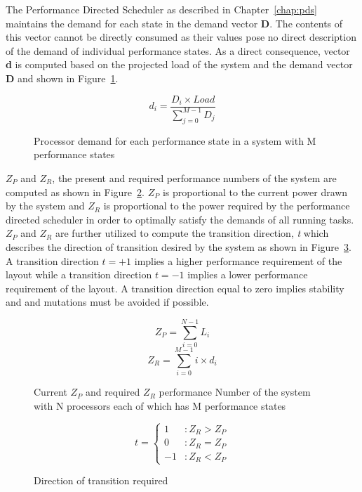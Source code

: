 The Performance Directed Scheduler as described in Chapter~\ref{chap:pds} maintains
the demand for each state in the demand vector \textbf{D}. The contents of this vector
cannot be directly consumed as their values pose no direct description of the demand 
of individual performance states. As a direct consequence, vector \textbf{d} is computed based 
on the projected load of the system and the demand vector \textbf{D} and shown in
Figure~\ref{fig:processor_demand}.

\begin{figure}[h!]
\centering
\begin{equation*}
    d_{i} = \frac{D_{i} \times Load}{\displaystyle\sum_{j=0}^{M-1} {D_{j}}}
\end{equation*}
\caption{Processor demand for each performance state in a system with M performance states}
\label{fig:processor_demand}
\end{figure}

$Z_{P}$ and $Z_{R}$, the present and required performance numbers of the system 
are computed as shown in Figure~\ref{fig:Z}. $Z_{P}$ is proportional to the current power drawn by
the system and $Z_{R}$ is proportional to the power required by the performance directed
scheduler in order to optimally satisfy the demands of all running tasks. $Z_{P}$ and $Z_{R}$ 
are further utilized to compute the transition direction, \textit{t} which describes the direction
of transition desired by the system as shown in Figure~\ref{fig:transition_dir}. A transition direction
$t = +1$ implies a higher performance requirement of the layout while a transition direction
$t = -1$ implies a lower performance requirement of the layout. A transition direction equal to zero
implies stability and and mutations must be avoided if possible.

\begin{figure}[h!]
\centering
\begin{equation*}
    Z_{P} = \displaystyle\sum_{i=0}^{N-1} {L_{i}} 
\end{equation*}
\begin{equation*}
    Z_{R} = \displaystyle\sum_{i=0}^{M-1} {i \times d_{i}} 
\end{equation*}
\caption{Current $Z_{P}$ and required $Z_{R}$ performance Number of the system with N processors each of which has M performance states}
\label{fig:Z}
\end{figure}

\begin{figure}[h!]
\centering
\begin{equation*}
    t = \left\{
     \begin{array}{lr}
       1 & : Z_{R} > Z_{P}\\
       0 & : Z_{R} = Z_{P} \\
       -1 & : Z_{R} < Z_{P}
     \end{array}
   \right.
\end{equation*}
\caption{Direction of transition required}
\label{fig:transition_dir}
\end{figure}

